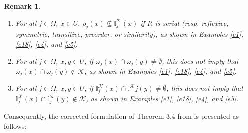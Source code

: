 \documentclass{article}
\theoremstyle{theorem}
\newtheorem{remark}{Remark}[section]
\theoremstyle{definition}
\theoremstyle{remark}
\begin{document}
\begin{remark} \label{rem3-2}
\begin{enumerate}
\item For all $j \in \Omega$, $x\in U$, \color{black} $\rho_{j}(x) \nsubseteq \mathbb{I}^{\mathcal{K}}_{j}(x)$ if $R$ is serial (resp. reflexive, symmetric, transitive, preorder, or similarity), as shown in Examples \ref{e1}, \ref{e18}, \ref{e4}, and \ref{e5}.
\item For all $j \in \Omega$,  $x, y\in U$, \color{black} if $\omega_{j}(x) \cap \omega_{j}(y) \neq \emptyset$, this does not imply that $\omega_{j}(x) \cap \omega_{j}(y) \not\in \mathcal{K}$, as shown in Examples \ref{e1}, \ref{e18}, \ref{e4}, and \ref{e5}.
\item For all $j \in \Omega$, $x, y\in U$, \color{black} if $\mathbb{I}^{\mathcal{K}}_{j}(x) \cap \mathbb{I}^{\mathcal{K}}{j}(y) \neq \emptyset$, this does not imply that $\mathbb{I}^{\mathcal{K}}_{j}(x) \cap \mathbb{I}^{\mathcal{K}}_{j}(y) \not\in \mathcal{K}$, as shown in Examples \ref{e1}, \ref{e18}, \ref{e4}, and \ref{e5}.
\end{enumerate}
\end{remark}


Consequently, the corrected formulation of Theorem 3.4 from \cite{Al-shami 2024} is presented as follows:
\end{document}
